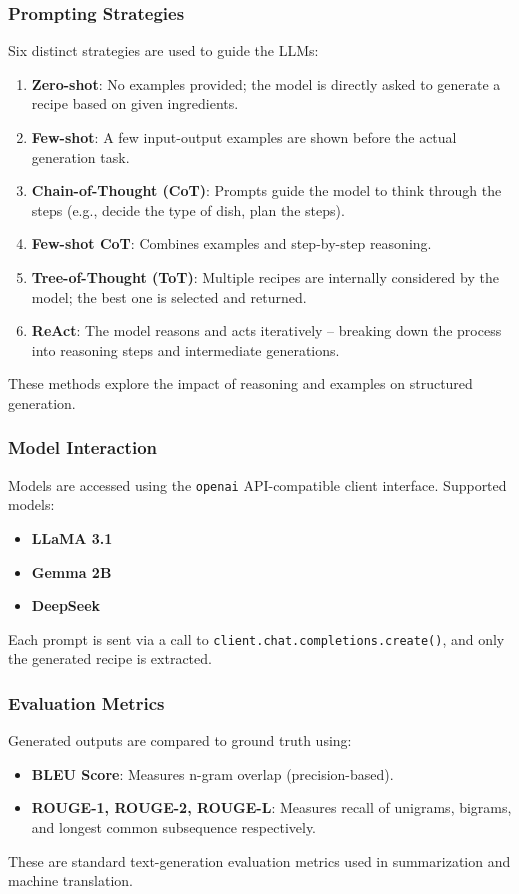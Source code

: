 \documentclass[letterpaper,11pt]{report}
\begin{document}
\subsubsection{Prompting Strategies}
Six distinct strategies are used to guide the LLMs:

\begin{enumerate}
  \item \textbf{Zero-shot}: No examples provided; the model is directly asked to generate a recipe based on given ingredients.
  \item \textbf{Few-shot}: A few input-output examples are shown before the actual generation task.
  \item \textbf{Chain-of-Thought (CoT)}: Prompts guide the model to think through the steps (e.g., decide the type of dish, plan the steps).
  \item \textbf{Few-shot CoT}: Combines examples and step-by-step reasoning.
  \item \textbf{Tree-of-Thought (ToT)}: Multiple recipes are internally considered by the model; the best one is selected and returned.
  \item \textbf{ReAct}: The model reasons and acts iteratively – breaking down the process into reasoning steps and intermediate generations.
\end{enumerate}

These methods explore the impact of reasoning and examples on structured generation.

\subsubsection{Model Interaction}
Models are accessed using the \texttt{openai} API-compatible client interface. Supported models:
\begin{itemize}
  \item \textbf{LLaMA 3.1}
  \item \textbf{Gemma 2B}
  \item \textbf{DeepSeek}
\end{itemize}

Each prompt is sent via a call to \texttt{client.chat.completions.create()}, and only the generated recipe is extracted.

\subsubsection{Evaluation Metrics}
Generated outputs are compared to ground truth using:
\begin{itemize}
  \item \textbf{BLEU Score}: Measures n-gram overlap (precision-based).
  \item \textbf{ROUGE-1, ROUGE-2, ROUGE-L}: Measures recall of unigrams, bigrams, and longest common subsequence respectively.
\end{itemize}
These are standard text-generation evaluation metrics used in summarization and machine translation.
\end{document}
